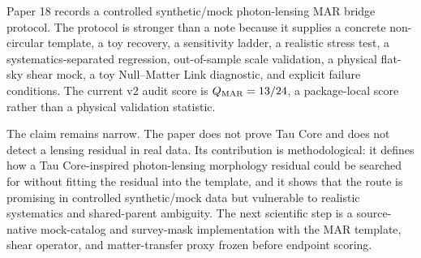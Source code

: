 \documentclass[12pt]{article}
\begin{document}
Paper 18 records a controlled synthetic/mock photon-lensing MAR bridge
protocol.  The protocol is stronger than a note because it supplies a concrete
non-circular template, a toy recovery, a sensitivity ladder, a realistic stress
test, a systematics-separated regression, out-of-sample scale validation, a
physical flat-sky shear mock, a toy Null--Matter Link diagnostic, and explicit
failure conditions.  The current v2 audit score is \(Q_{\rm MAR}=13/24\), a
package-local score rather than a physical validation statistic.

The claim remains narrow.  The paper does not prove Tau Core and does not
detect a lensing residual in real data.  Its contribution is methodological:
it defines how a Tau Core-inspired photon-lensing morphology residual could be
searched for without fitting the residual into the template, and it shows that
the route is promising in controlled synthetic/mock data but vulnerable to
realistic systematics and shared-parent ambiguity.  The next scientific step is
a source-native mock-catalog and survey-mask implementation with the MAR
template, shear operator, and matter-transfer proxy frozen before endpoint
scoring.



\end{document}
